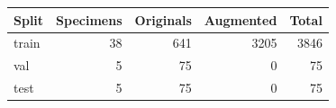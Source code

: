 \begin{tabular}{lrrrr}
\toprule
Split & Specimens & Originals & Augmented & Total \\
\midrule
train & 38 & 641 & 3205 & 3846 \\
val & 5 & 75 & 0 & 75 \\
test & 5 & 75 & 0 & 75 \\
\bottomrule
\end{tabular}
